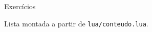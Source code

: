 \begin{frame}{Exercícios}
  \small
  \setlength{\itemsep}{0.55em}
  \begin{enumerate}
    \exercicios
  \end{enumerate}

  \vfill
  {\scriptsize\color{fisicamuted}%
   Lista montada a partir de \texttt{lua/conteudo.lua}.}
\end{frame}
